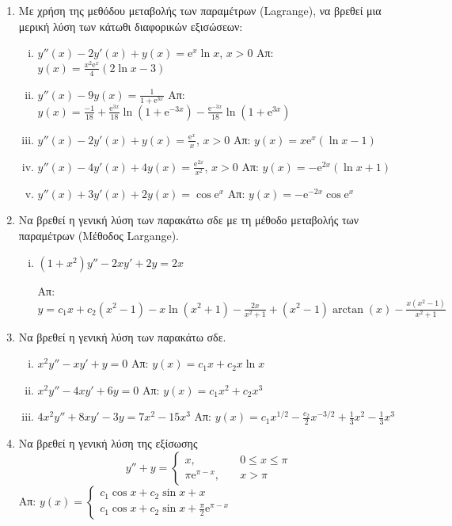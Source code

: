 \begin{enumerate}
  \item Με χρήση της μεθόδου μεταβολής των παραμέτρων (Lagrange), να βρεθεί 
    μια μερική λύση των κάτωθι διαφορικών εξισώσεων:
    \begin{enumerate}[i)]
      \item $y''(x)-2y'(x)+y(x)=\mathrm{e}^{x}\ln x$, $x>0$ 
        \hfill Απ: $y(x)=\frac{x^{2}\mathrm{e}^{x}}{4}(2\ln x-3)$
      \item $y''(x)-9y(x)=\frac{1}{1+\mathrm{e}^{3x}}$ 
        \hfill Απ: $y(x)=\frac{-1}{18}+\frac{\mathrm{e}^{3x}}{18}
        \ln (1+\mathrm{e}^{-3x})- \frac{\mathrm{e}^{-3x}}{18}\ln(1+\mathrm{e}^{3x})$
      \item $y''(x)-2y'(x)+y(x)=\frac{\mathrm{e}^x}{x}$, $x>0$ 
        \hfill Απ: $y(x)=x\mathrm{e}^{x}(\ln x-1)$
      \item $y''(x)-4y'(x)+4y(x)=\frac{\mathrm{e}^{2x}}{x^{2}}$, $x>0$ 
        \hfill Απ: $y(x)=-\mathrm{e}^{2x}(\ln x +1)$
      \item $y''(x)+3y'(x)+2y(x)=\cos \mathrm{e}^{x}$ 
        \hfill Απ: $y(x)=-\mathrm{e}^{-2x}\cos \mathrm{e}^{x}$
    \end{enumerate}

  \item Να βρεθεί η γενική λύση των παρακάτω σδε με τη μέθοδο μεταβολής των 
    παραμέτρων (Μέθοδος Largange).
    \begin{enumerate}[i)]
      \item $ (1+x^{2})y''-2xy'+2y=2x $ 

        \hfill Απ: $ y= c_{1}x + c_{2}(x^{2}-1) - x \ln{(x^{2}+1)} - \frac{2x}{x^{2}+1}
        + (x^{2}-1) \arctan(x) - \frac{x(x^{2}-1)}{x^{2}+1} $
    \end{enumerate}

  \item Να βρεθεί η γενική λύση των παρακάτω σδε.
    \begin{enumerate}[i)]
      \item $ x^{2}y'' - xy' + y = 0 $ \hfill Απ: $ y(x)= c_{1}x + c_{2}x \ln{x} $ 
      \item $ x^{2}y'' - 4xy'+6y = 0 $ \hfill Απ: $ y(x)=c_{1}x^{2} + c_{2}x^{3} $ 
      \item $ 4x^{2}y'' + 8x y' -3y = 7x^{2}-15x^{3} $ 
        \hfill Απ: $ y(x)= c_{1} x^{1/2} - \frac{c_{2}}{2} x^{-3/2} + 
        \frac{1}{3} x^{2} - \frac{1}{3} x^{3} $ 
    \end{enumerate}

  \item Να βρεθεί η γενική λύση της εξίσωσης 
    \[
      y''+y = 
      \begin{cases} 
        x, \quad &0 \leq x \leq \pi \\
        \pi \mathrm{e}^{\pi -x}, \quad &x > \pi
      \end{cases}
    \] 
    \hfill Απ: $ y(x) = 
    \begin{cases} 
      c_{1} \cos{x} + c_{2} \sin{x} + x \\
      c_{1} \cos{x} + c_{2} \sin{x} + \frac{\pi}{2} \mathrm{e}^{\pi -x} 
    \end{cases} $ 
\end{enumerate}






